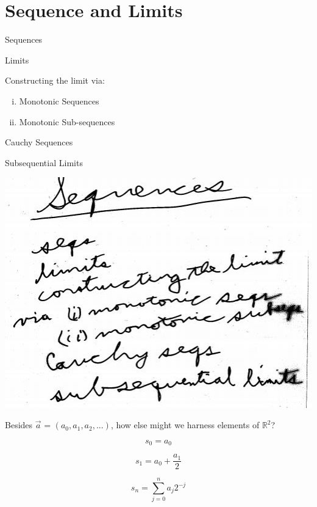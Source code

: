 \documentclass[10pt,a4paper]{article}
\begin{document}



\section{Sequence and Limits}


Sequences

Limits

Constructing the limit via:

\begin{enumerate} [(i)]

\item Monotonic Sequences
\item Monotonic Sub-sequences 

\end{enumerate}

Cauchy Sequences

Subsequential Limits 

\includegraphics[scale=.8]{Pages/S&L_page1}

\newpage


Besides $\vec{a}$ = $(a{_0}, a_{1}, a_{2}, ...)$, how else might we harness elements of $\mathbb {R}^{2}$?

$$s_0 = a_{0}$$

$$s_1 = a_{0} + \frac{a_{1}}{2}$$



$$s_{n} = \sum_{j=0}^{n} a_{j} 2^{-j}$$
\end{document}
